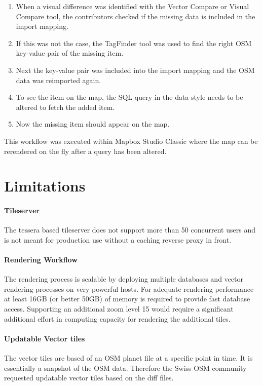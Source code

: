 \begin{enumerate}
\item When a visual difference was identified with the Vector Compare or Visual Compare tool, the contributors checked if the missing data is included in the import mapping.
\item If this was not the case, the TagFinder tool\cite{93_wiki.openstreetmap.org_2015} was used to find the right OSM key-value pair of the missing item.
\item Next the key-value pair was included into the import mapping and the OSM data was reimported again.
\item To see the item on the map, the SQL query in the data style needs to be altered to fetch the added item.
\item Now the missing item should appear on the map.
\end{enumerate}

This workflow was executed within Mapbox Studio Classic\cite{mapbox_studio_classic} where
the map can be rerendered on the fly after a query has been altered.

\section{Limitations}\label{project_limitations}

\paragraph{Tileserver} The tessera based tileserver does not support more than 50 concurrent users and is not meant for production use without a caching reverse proxy in front.

\paragraph{Rendering Workflow} The rendering process is scalable by deploying multiple databases and vector rendering processes on very powerful hosts. For adequate rendering performance at least 16GB (or better 50GB) of memory is required to provide fast database access.
Supporting an additional zoom level 15 would require a significant additional effort in computing capacity for rendering the additional tiles.

\paragraph{Updatable Vector tiles} The vector tiles are based of an OSM planet file at a specific point in time. It is essentially a snapshot of the OSM data. Therefore the Swiss OSM community requested updatable vector tiles based on the diff files.

